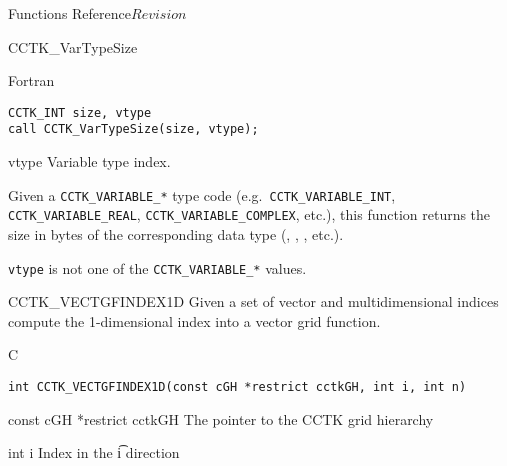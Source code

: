 \begin{cactuspart}{ Functions Reference}{}{$Revision$}
\begin{FunctionDescription}{CCTK\_VarTypeSize}
\begin{SynopsisSection}
\begin{Synopsis}{Fortran}
\begin{verbatim}
CCTK_INT size, vtype
call CCTK_VarTypeSize(size, vtype);
\end{verbatim}
\end{Synopsis}
\end{SynopsisSection}

\begin{ParameterSection}
\begin{Parameter}{vtype}
Variable type index.
\end{Parameter}
\end{ParameterSection}

\begin{Discussion}
Given a \verb|CCTK_VARIABLE_*| type code (e.g.~\verb|CCTK_VARIABLE_INT|,
\verb|CCTK_VARIABLE_REAL|, \verb|CCTK_VARIABLE_COMPLEX|, etc.), this
function returns the size in bytes of the corresponding data type
(, , , etc.).
\end{Discussion}

\begin{ErrorSection}
\begin{Error}{-1}
\verb|vtype| is not one of the \verb|CCTK_VARIABLE_*| values.
\end{Error}
\end{ErrorSection}
\end{FunctionDescription}



\begin{FunctionDescription}{CCTK\_VECTGFINDEX1D}
\label{CCTK-VECTGFINDEX1D}
Given a set of vector and multidimensional indices compute the 1-dimensional
index into a vector grid function.
\begin{SynopsisSection}
\begin{Synopsis}{C}
\begin{verbatim}
int CCTK_VECTGFINDEX1D(const cGH *restrict cctkGH, int i, int n)
\end{verbatim}
\end{Synopsis}
\end{SynopsisSection}

\begin{ParameterSection}
\begin{Parameter} {const cGH *restrict cctkGH}
The pointer to the CCTK grid hierarchy
\end{Parameter}

\begin{Parameter} {int i}
Index in the \t{i} direction
\end{Parameter}


\end{ParameterSection}
\end{FunctionDescription}
\end{cactuspart}
